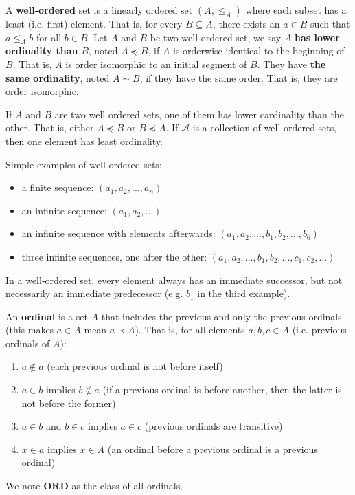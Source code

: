 \documentclass{article}
\newcommand{\marginleft}[1] {\reversemarginpar\marginpar{#1}}
\def\ordinals{\textbf{ORD}}
\def\ordless{\prec}
\def\ordleq{\preceq}
\def\ordeq{\sim}
\begin{document}
\begin{defn}
	A \textbf{well-ordered} \marginleft{Well-order} set is a linearly ordered set $(A, \leq_A)$ where each subset has a least (i.e. first) element. That is, for every $B \subseteq A$, there exists an $a \in B$ such that $a \leq_A b$ for all $b \in B$. Let $A$ and $B$ be two well ordered set, we say $A$ \textbf{has lower ordinality than} $B$, noted $A \ordleq B$, if $A$ is orderwise identical to the beginning of $B$. That is, $A$ is order isomorphic to an initial segment of $B$. They have \textbf{the same ordinality}, noted $A \ordeq B$, if they have the same order. That is, they are order isomorphic.
\end{defn}

\begin{prop}[Ordinality]
	If $A$ and $B$ are two well ordered sets, one of them has lower cardinality than the other. That is, either $A \ordleq B$ or $B \ordleq A$. If $\mathcal{A}$ is a collection of well-ordered sets, then one element has least ordinality.
\end{prop}

\begin{remark}
	Simple examples of well-ordered sets:
	\begin{itemize}
		\item a finite sequence: $(a_1, a_2, ..., a_n)$
		\item an infinite sequence: $(a_1, a_2, ...)$
		\item an infinite sequence with elements afterwards: $(a_1, a_2, ..., b_1, b_2, ... , b_6)$
		\item three infinite sequences, one after the other: $(a_1, a_2, ..., b_1, b_2, ... , c_1, c_2, ...)$
	\end{itemize}
	In a well-ordered set, every element always has an immediate successor, but not necessarily an immediate predecessor (e.g. $b_1$ in the third example).
\end{remark}

\begin{defn}[Ordinals]
	An \textbf{ordinal} \marginleft{Ordinals: \ordinals} is a set $A$ that includes the previous and only the previous ordinals (this makes $a \in A$ mean $a \ordless A$). That is, for all elements $a, b, c \in A$ (i.e. previous ordinals of $A$):
	\begin{enumerate}
		\item $a \notin a$ (each previous ordinal is not before itself)
		\item $a \in b$ implies $b \notin a$ (if a previous ordinal is before another, then the latter is not before the former)
		\item $a \in b$ and $b \in c$ implies $a \in c$ (previous ordinals are transitive)
		\item $x \in a$ implies $x \in A$ (an ordinal before a previous ordinal is a previous ordinal)
	\end{enumerate}
	We note $\ordinals$ as the class of all ordinals.
\end{defn}
\end{document}
